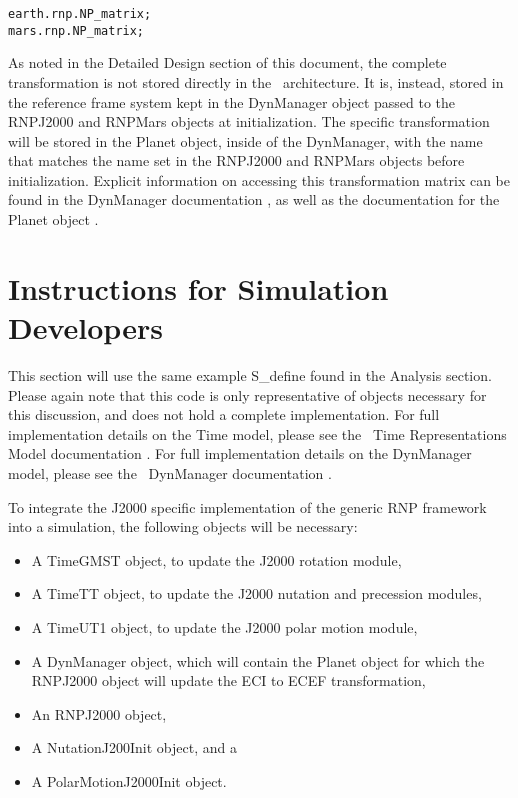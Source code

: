 \begin{verbatim}
earth.rnp.NP_matrix;
mars.rnp.NP_matrix;
\end{verbatim}

As noted in the Detailed Design section of this document, the complete
transformation is not stored directly in the \ModelDesc\ architecture. It is,
instead, stored in the reference frame system kept in the DynManager object
passed to the RNPJ2000 and RNPMars objects at initialization. The specific
transformation will be stored in the Planet object, inside of the DynManager,
with the name that matches the name set in the RNPJ2000 and RNPMars objects
before initialization.
Explicit information on accessing this transformation matrix can be found
in the DynManager documentation \cite{dynenv:DYNMANAGER}, as well as the
documentation for the Planet object \cite{dynenv:PLANET}.


\section{Instructions for Simulation Developers}

This section will use the same example S\_define found in the Analysis section.
Please again note that this code is only representative of objects necessary
for this discussion, and does not hold a complete implementation.
For full implementation details on the Time model, please see
the \JEODid\ Time Representations Model documentation \cite{dynenv:TIME}.
For full implementation details on the DynManager model,
please see the \JEODid\ DynManager documentation
\cite{dynenv:DYNMANAGER}.

To integrate the J2000 specific implementation of the generic RNP framework
into a simulation, the following objects will be necessary:

\begin{itemize}
\item{A TimeGMST object}, to update the J2000 rotation module,
\item{A TimeTT object}, to update the J2000 nutation and precession modules,
\item{A TimeUT1 object}, to update the J2000 polar motion module,
\item{A DynManager object}, which will contain the Planet object for which the
RNPJ2000 object will update the ECI to ECEF transformation,
\item{An RNPJ2000 object},
\item{A NutationJ200Init object}, and a
\item{A PolarMotionJ2000Init object}.
\end{itemize}

